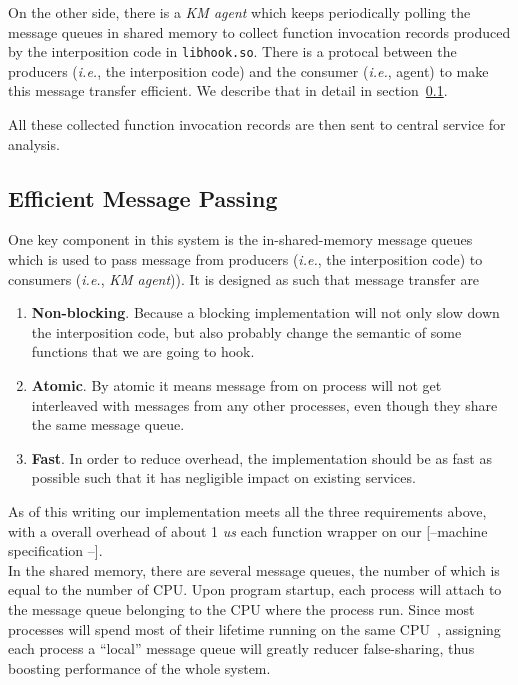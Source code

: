\documentclass[letterpaper,twocolumn,10pt]{article}
\begin{document}
On the other side, there is a \textit{KM agent} which keeps periodically
polling the message queues in shared memory to collect function invocation
records produced by the interposition code in \texttt{libhook.so}. There is a
protocal between the producers (\textit{i.e.}, the interposition code) and
the consumer (\textit{i.e.}, agent) to make this message transfer efficient.
We describe that in detail in section~\ref{sec:effimq}. 

All these collected function invocation records are then sent to central
service for analysis. 

\subsection{Efficient Message Passing} \label{sec:effimq}
One key component in this system is the in-shared-memory message queues which
is used to pass message from producers (\textit{i.e.}, the interposition
code) to consumers (\textit{i.e.}, \textit{KM agent})). It is designed as
such that message transfer are 
\begin{enumerate}
    \item \textbf{Non-blocking}. Because a blocking
        implementation will not only slow down the interposition code, but
        also probably change the semantic of some functions that we are going
        to hook.
    \item \textbf{Atomic}. By atomic it means message from on
        process will not get interleaved with messages from any other
        processes, even though they share the same message queue.
    \item \textbf{Fast}. In order to reduce overhead, the implementation should
        be as fast as possible such that it has negligible impact on existing
        services.
\end{enumerate}
As of this writing our implementation meets all the three requirements above,
with a overall overhead of about 1 \textit{us} each function wrapper on our
[--machine specification --].\\ 


In the shared memory, there are several message queues, the number of which
is equal to the number of CPU. Upon program startup, each process will attach
to the message queue belonging to the CPU where the process run. Since most
processes will spend most of their lifetime running on the same
CPU~\cite{somebodyhere}, assigning each process a ``local'' message queue
will greatly reducer false-sharing, thus boosting performance of the whole
system. 
\end{document}
